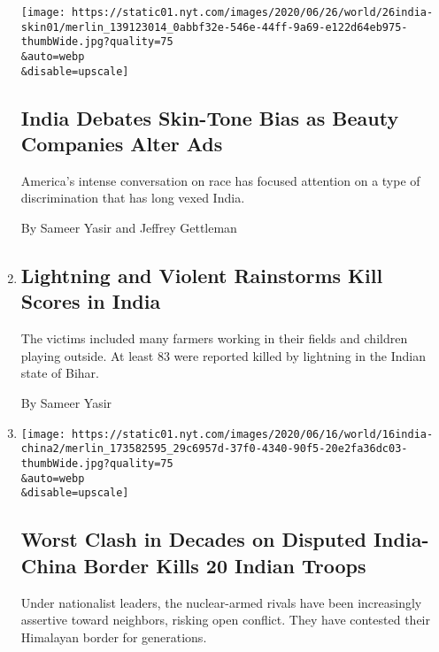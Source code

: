 \begin{enumerate}
  \texttt{[image: https://static01.nyt.com/images/2020/06/26/world/26india-skin01/merlin\_139123014\_0abbf32e-546e-44ff-9a69-e122d64eb975-thumbWide.jpg?quality=75\\\&auto=webp\\\&disable=upscale]}

  \hypertarget{india-debates-skin-tone-bias-as-beauty-companies-alter-ads}{%
  \subsection{India Debates Skin-Tone Bias as Beauty Companies Alter
  Ads}\label{india-debates-skin-tone-bias-as-beauty-companies-alter-ads}}

  America's intense conversation on race has focused attention on a type
  of discrimination that has long vexed India.

  By Sameer Yasir and Jeffrey Gettleman
\item
  \href{/2020/06/25/world/asia/india-monsoon-lightning-rainstorms.html}{}

  \hypertarget{lightning-and-violent-rainstorms-kill-scores-in-india}{%
  \subsection{Lightning and Violent Rainstorms Kill Scores in
  India}\label{lightning-and-violent-rainstorms-kill-scores-in-india}}

  The victims included many farmers working in their fields and children
  playing outside. At least 83 were reported killed by lightning in the
  Indian state of Bihar.

  By Sameer Yasir
\item
  \href{/2020/06/16/world/asia/indian-china-border-clash.html}{}

  \texttt{[image: https://static01.nyt.com/images/2020/06/16/world/16india-china2/merlin\_173582595\_29c6957d-37f0-4340-90f5-20e2fa36dc03-thumbWide.jpg?quality=75\\\&auto=webp\\\&disable=upscale]}

  \hypertarget{worst-clash-in-decades-on-disputed-india-china-border-kills-20-indian-troops}{%
  \subsection{Worst Clash in Decades on Disputed India-China Border
  Kills 20 Indian
  Troops}\label{worst-clash-in-decades-on-disputed-india-china-border-kills-20-indian-troops}}

  Under nationalist leaders, the nuclear-armed rivals have been
  increasingly assertive toward neighbors, risking open conflict. They
  have contested their Himalayan border for generations.


\end{enumerate}
